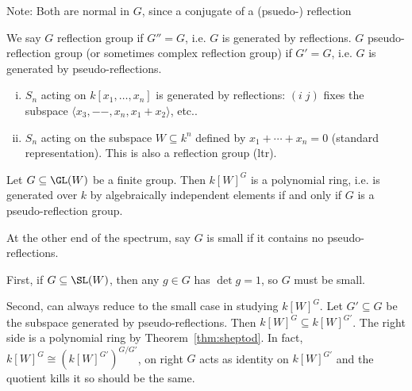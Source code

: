 Note: Both are normal in $G$, since a conjugate of a (psuedo-) reflection 


\begin{dfn}
We say $G$ reflection group if $G''=G$, i.e. $G$ is generated by reflections. $G$ pseudo-reflection group (or sometimes complex reflection group) if $G'=G$, i.e. $G$ is generated by pseudo-reflections. 
\end{dfn}


\begin{ex} \hfill
\begin{enumerate}[(i)]
\item $S_n$ acting on $k[x_1,\ldots,x_n]$ is generated by reflections: $(i\;j)$ fixes the subspace $\langle x_3, -- , x_n,x_1+x_2 \rangle$, etc.. 
\item $S_n$ acting on the subspace $W \subseteq k^n$ defined by $x_1+\cdots+x_n=0$ (standard representation). This is also a reflection group (ltr). 
\end{enumerate}
\end{ex}


\begin{thm} \label{thm:sheptod}
Let $G \subseteq \GL(W)$ be a finite group. Then $k[W]^G$ is a polynomial ring, i.e. is generated over $k$ by algebraically independent elements if and only if $G$ is a pseudo-reflection group. 
\end{thm}




At the other end of the spectrum, say $G$ is small if it contains no pseudo-reflections. 


First, if $G \subseteq \SL(W)$, then any $g \in G$ has $\det g=1$, so $G$ must be small. 

Second, can always reduce to the small case in studying $k[W]^G$. Let $G' \subseteq G$ be the subspace generated by pseudo-reflections. Then $k[W]^G \subseteq k[W]^{G'}$. The right side is a polynomial ring by Theorem~\ref{thm:sheptod}. In fact, $k[W]^G \cong (k[W]^{G'})^{G/G'}$, on right $G$ acts as identity on $k[W]^{G'}$ and the quotient kills it so should be the same. 







